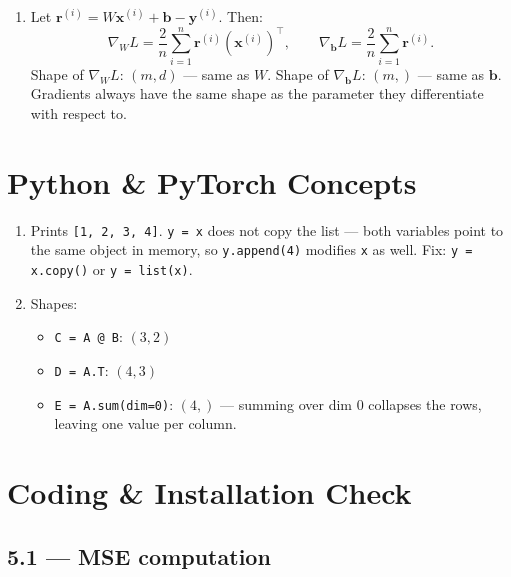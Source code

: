 \documentclass[12pt, a4paper]{scrartcl}
\begin{document}
\begin{enumerate}
\item Let $\mathbf{r}^{(i)} = W\mathbf{x}^{(i)} + \mathbf{b} - \mathbf{y}^{(i)}$. Then:
\[
\nabla_W L = \frac{2}{n}\sum_{i=1}^{n} \mathbf{r}^{(i)} (\mathbf{x}^{(i)})^\top, \qquad \nabla_\mathbf{b} L = \frac{2}{n}\sum_{i=1}^{n} \mathbf{r}^{(i)}.
\]
Shape of $\nabla_W L$: $(m, d)$ --- same as $W$. Shape of $\nabla_\mathbf{b} L$: $(m,)$ --- same as $\mathbf{b}$.\\
Gradients always have the same shape as the parameter they differentiate with respect to.

\end{enumerate}

\section{Python \& PyTorch Concepts}

\begin{enumerate}

\item Prints \texttt{[1, 2, 3, 4]}. \texttt{y = x} does not copy the list --- both variables point to the same object in memory, so \texttt{y.append(4)} modifies \texttt{x} as well. Fix: \texttt{y = x.copy()} or \texttt{y = list(x)}.

\item Shapes:
\begin{itemize}
    \item \texttt{C = A @ B}: $(3, 2)$
    \item \texttt{D = A.T}: $(4, 3)$
    \item \texttt{E = A.sum(dim=0)}: $(4,)$ --- summing over dim 0 collapses the rows, leaving one value per column.
\end{itemize}

\end{enumerate}

\section{Coding \& Installation Check}

\subsection*{5.1 --- MSE computation}
\end{document}

